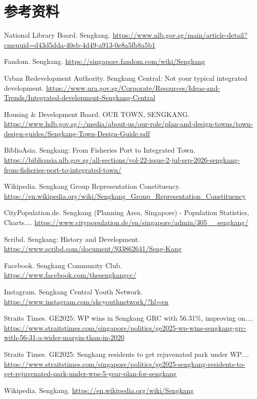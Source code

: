 \documentclass[11pt,a4paper,twoside,openany]{book}
\begin{document}
\section*{参考资料}
\begin{enumerate}[label={[\arabic*]},leftmargin=*,topsep=2pt,itemsep=1pt,parsep=0pt]
  \item National Library Board. Sengkang. \url{https://www.nlb.gov.sg/main/article-detail?cmsuuid=d43d5dda-40eb-4d49-a913-0e8a5fb8a5b1}
  \item Fandom. Sengkang. \url{https://singapore.fandom.com/wiki/Sengkang}
  \item Urban Redevelopment Authority. Sengkang Central: Not your typical integrated development. \url{https://www.ura.gov.sg/Corporate/Resources/Ideas-and-Trends/Integrated-development-Sengkang-Central}
  \item Housing \& Development Board. OUR TOWN, SENGKANG. \url{https://www.hdb.gov.sg/-/media/about-us/our-role/plan-and-design-towns/town-design-guides/Sengkang-Town-Design-Guide.pdf}
  \item BiblioAsia. Sengkang: From Fisheries Port to Integrated Town. \url{https://biblioasia.nlb.gov.sg/all-sections/vol-22-issue-2-jul-sep-2026-sengkang-from-fisheries-port-to-integrated-town/}
  \item Wikipedia. Sengkang Group Representation Constituency. \url{https://en.wikipedia.org/wiki/Sengkang_Group_Representation_Constituency}
  \item CityPopulation.de. Sengkang (Planning Area, Singapore) - Population Statistics, Charts.... \url{https://www.citypopulation.de/en/singapore/admin/305__sengkang/}
  \item Scribd. Sengkang: History and Development. \url{https://www.scribd.com/document/933862641/Seng-Kang}
  \item Facebook. Sengkang Community Club. \url{https://www.facebook.com/thesengkangcc/}
  \item Instagram. Sengkang Central Youth Network. \url{https://www.instagram.com/skcyouthnetwork/?hl=en}
  \item Straits Times. GE2025: WP wins in Sengkang GRC with 56.31\%, improving on.... \url{https://www.straitstimes.com/singapore/politics/ge2025-wp-wins-sengkang-grc-with-56-31-a-wider-margin-than-in-2020}
  \item Straits Times. GE2025: Sengkang residents to get rejuvenated park under WP.... \url{https://www.straitstimes.com/singapore/politics/ge2025-sengkang-residents-to-get-rejuvenated-park-under-wps-5-year-plan-for-sengkang}
  \item Wikipedia. Sengkang. \url{https://en.wikipedia.org/wiki/Sengkang}
\end{enumerate}
\end{document}
